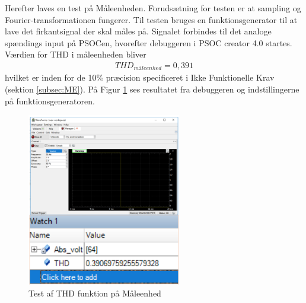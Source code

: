 Herefter laves en test på Måleenheden. Forudsætning for testen er at sampling og Fourier-transformationen fungerer. Til testen bruges en funktionsgenerator til at lave det firkantsignal der skal måles på. Signalet forbindes til det analoge spændings input på PSOCen, hvorefter debuggeren i PSOC creator 4.0 startes. Værdien for THD i måleenheden bliver 
\begin{align}
THD_{måleenhed} = 0,391
\end{align}
hvilket er inden for de 10\% præcision specificeret i Ikke Funktionelle Krav (sektion \ref{subsec:ME}). På Figur \ref{fig:METHDtest} ses resultatet fra debuggeren og indstillingerne på funktionsgeneratoren. 

\begin{figure}[htbp] %
	\centering
	\includegraphics[width=0.6\textwidth]{Figure/METHDtest}
	\caption{Test af THD funktion på Måleenhed}
	\label{fig:METHDtest}
\end{figure}